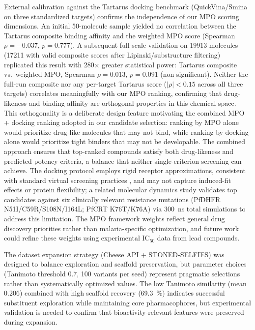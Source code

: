 \documentclass[journal=jcisd8,manuscript=article]{achemso}
\begin{document}
External calibration against the Tartarus docking benchmark \citep{nigam2023tartarus} (QuickVina/Smina on three standardized targets) confirms the independence of our MPO scoring dimensions. An initial 50-molecule sample yielded no correlation between the Tartarus composite binding affinity and the weighted MPO score (Spearman $\rho = \num{-0.037}$, $p = \num{0.777}$). A subsequent full-scale validation on \num{19913} molecules (\num{17211} with valid composite scores after Lipinski/substructure filtering) replicated this result with \num{280}$\times$ greater statistical power: Tartarus composite vs.\ weighted MPO, Spearman $\rho = \num{0.013}$, $p = \num{0.091}$ (non-significant). Neither the full-run composite nor any per-target Tartarus score ($|\rho| < \num{0.15}$ across all three targets) correlates meaningfully with our MPO ranking, confirming that drug-likeness and binding affinity are orthogonal properties in this chemical space. This orthogonality is a deliberate design feature motivating the combined MPO + docking ranking adopted in our candidate selection: ranking by MPO alone would prioritize drug-like molecules that may not bind, while ranking by docking alone would prioritize tight binders that may not be developable. The combined approach ensures that top-ranked compounds satisfy both drug-likeness and predicted potency criteria, a balance that neither single-criterion screening can achieve. The docking protocol employs rigid receptor approximations, consistent with standard virtual screening practices \citep{kitchen2004, shoichet2004}, and may not capture induced-fit effects or protein flexibility; a related molecular dynamics study validates top candidates against six clinically relevant resistance mutations (PfDHFR N51I/C59R/S108N/I164L; PfCRT K76T/K76A) via 300~ns total simulations to address this limitation. The MPO framework weights reflect general drug discovery priorities rather than malaria-specific optimization, and future work could refine these weights using experimental IC$_{50}$ data from lead compounds.

The dataset expansion strategy (Cheese API + STONED-SELFIES) was designed to balance exploration and scaffold preservation, but parameter choices (Tanimoto threshold \num{0.7}, \num{100} variants per seed) represent pragmatic selections rather than systematically optimized values. The low Tanimoto similarity (mean \num{0.206}) combined with high scaffold recovery (\qty{69.3}{\percent}) indicates successful substituent exploration while maintaining core pharmacophores, but experimental validation is needed to confirm that bioactivity-relevant features were preserved during expansion.
\end{document}
